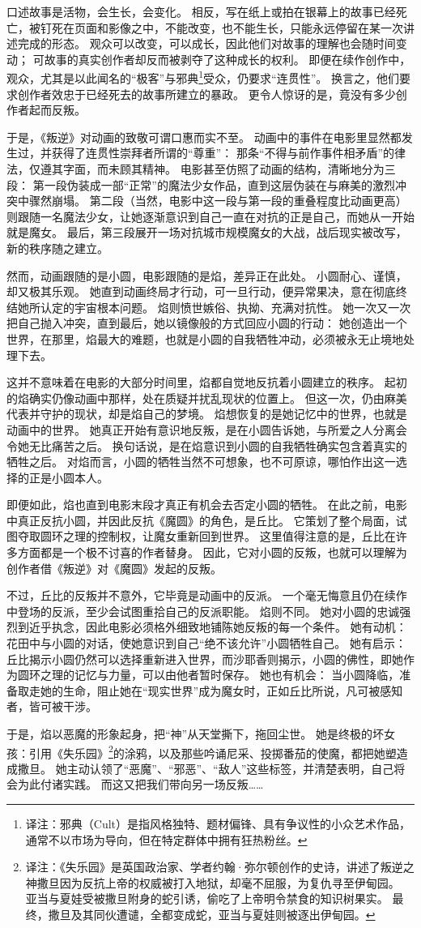 口述故事是活物，会生长，会变化。
相反，写在纸上或拍在银幕上的故事已经死亡，被钉死在页面和影像之中，不能改变，也不能生长，只能永远停留在某一次讲述完成的形态。
观众可以改变，可以成长，因此他们对故事的理解也会随时间变动；
可故事的真实创作者却反而被剥夺了这种成长的权利。
即便在续作创作中，观众，尤其是以此闻名的“极客”与邪典\footnote{
    译注：邪典（Cult）是指风格独特、题材偏锋、具有争议性的小众艺术作品，通常不以市场为导向，但在特定群体中拥有狂热粉丝。
}受众，仍要求“连贯性”。
换言之，他们要求创作者效忠于已经死去的故事所建立的暴政。
更令人惊讶的是，竟没有多少创作者起而反叛。

于是，《叛逆》对动画的致敬可谓口惠而实不至。
动画中的事件在电影里显然都发生过，并获得了连贯性崇拜者所谓的“尊重”：
那条“不得与前作事件相矛盾”的律法，仅遵其字面，而未顾其精神。
电影甚至仿照了动画的结构，清晰地分为三段：
第一段伪装成一部“正常”的魔法少女作品，直到这层伪装在与麻美的激烈冲突中骤然崩塌。
第二段（当然，电影中这一段与第一段的重叠程度比动画更高）则跟随一名魔法少女，让她逐渐意识到自己一直在对抗的正是自己，而她从一开始就是魔女。
最后，第三段展开一场对抗城市规模魔女的大战，战后现实被改写，新的秩序随之建立。

然而，动画跟随的是小圆，电影跟随的是焰，差异正在此处。
小圆耐心、谨慎，却又极其乐观。
她直到动画终局才行动，可一旦行动，便异常果决，意在彻底终结她所认定的宇宙根本问题。
焰则愤世嫉俗、执拗、充满对抗性。
她一次又一次把自己抛入冲突，直到最后，她以镜像般的方式回应小圆的行动：
她创造出一个世界，在那里，焰最大的难题，也就是小圆的自我牺牲冲动，必须被永无止境地处理下去。

这并不意味着在电影的大部分时间里，焰都自觉地反抗着小圆建立的秩序。
起初的焰确实仍像动画中那样，处在质疑并扰乱现状的位置上。
但这一次，仍由麻美代表并守护的现状，却是焰自己的梦境。
焰想恢复的是她记忆中的世界，也就是动画中的世界。
她真正开始有意识地反叛，是在小圆告诉她，与所爱之人分离会令她无比痛苦之后。
换句话说，是在焰意识到小圆的自我牺牲确实包含着真实的牺牲之后。
对焰而言，小圆的牺牲当然不可想象，也不可原谅，哪怕作出这一选择的正是小圆本人。

即便如此，焰也直到电影末段才真正有机会去否定小圆的牺牲。
在此之前，电影中真正反抗小圆，并因此反抗《魔圆》的角色，是丘比。
它策划了整个局面，试图夺取圆环之理的控制权，让魔女重新回到世界。
这里值得注意的是，丘比在许多方面都是一个极不讨喜的作者替身。
因此，它对小圆的反叛，也就可以理解为创作者借《叛逆》对《魔圆》发起的反叛。

不过，丘比的反叛并不意外，它毕竟是动画中的反派。
一个毫无悔意且仍在续作中登场的反派，至少会试图重拾自己的反派职能。
焰则不同。
她对小圆的忠诚强烈到近乎执念，因此电影必须格外细致地铺陈她反叛的每一个条件。
她有动机：
花田中与小圆的对话，使她意识到自己“绝不该允许”小圆牺牲自己。
她有启示：
丘比揭示小圆仍然可以选择重新进入世界，而沙耶香则揭示，小圆的佛性，即她作为圆环之理的记忆与力量，可以由他者暂时保存。
她也有机会：
当小圆降临，准备取走她的生命，阻止她在“现实世界”成为魔女时，正如丘比所说，凡可被感知者，皆可被干涉。

于是，焰以恶魔的形象起身，把“神”从天堂撕下，拖回尘世。
她是终极的坏女孩：引用《失乐园》\footnote{%
    译注：《失乐园》是英国政治家、学者约翰·弥尔顿创作的史诗，讲述了叛逆之神撒旦因为反抗上帝的权威被打入地狱，却毫不屈服，为复仇寻至伊甸园。
    亚当与夏娃受被撒旦附身的蛇引诱，偷吃了上帝明令禁食的知识树果实。
    最终，撒旦及其同伙遭谴，全都变成蛇，亚当与夏娃则被逐出伊甸园。
}的涂鸦，以及那些吟诵尼采、投掷番茄的使魔，都把她塑造成撒旦。
她主动认领了“恶魔”、“邪恶”、“敌人”这些标签，并清楚表明，自己将会为此付诸实践。
而这又把我们带向另一场反叛……
